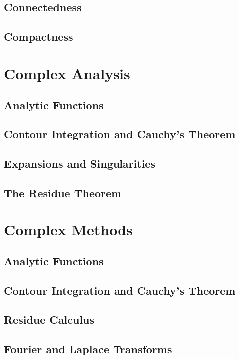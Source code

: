 \documentclass[12pt]{book}
\theoremstyle{definition}
\theoremstyle{remark}
\begin{document}
		\section{Connectedness}
		
		\section{Compactness}
		
	\chapter{Complex Analysis}
		\section{Analytic Functions}
		
		\section{Contour Integration and Cauchy's Theorem}
		
		\section{Expansions and Singularities}
		
		\section{The Residue Theorem}
		
	\chapter{Complex Methods}
		\section{Analytic Functions}
		
		\section{Contour Integration and Cauchy's Theorem}
		
		\section{Residue Calculus}
		
		\section{Fourier and Laplace Transforms}
	
\end{document}
